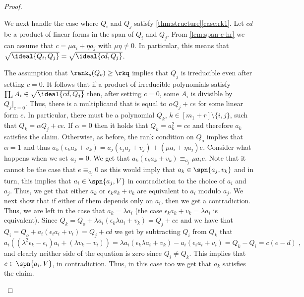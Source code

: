 \begin{proof}
\begin{enumerate}[label=(\roman*)]
	We next handle the case where $Q_i$ and $Q_j$ satisfy \autoref{thm:structure}\ref{case:rk1}. Let $cd$ be a product of linear forms in the span of $Q_i$ and $Q_j$. From \autoref{lem:span-c-hr} we can assume that $c=\mu a_i+\eta a_j$ with $\mu\eta\neq 0$. In particular, this means that $\sqrt{\ideal{Q_i,Q_j}} = \sqrt{\ideal{cd,Q_j}}$. 
	
	The assumption that $\rank_s(Q_o)\geq \rkq$ implies that $Q_j$ is irreducible even after setting $c=0$. It follows that if a product of irreducible polynomials satisfy $\prod_i A_i \in  \sqrt{\ideal{cd,Q_j}}$ then, after setting $c=0$, some $A_i$ is divisible by ${Q_j}|_{c=0}$. Thus, there is a multiplicand that is equal to $ \alpha Q_j + ce$ for some linear form $e$. In particular, there must be a polynomial $Q_k$, $k\in[m_1+r]\setminus \{i,j\}$, such that  $Q_k = \alpha Q_j + ce$.
	If $\alpha = 0$ then it holds that $Q_k = a_k^2 = ce$ and therefore $a_k$ satisfies the claim. Otherwise, as before, the rank condition on $Q_o$ implies that $\alpha = 1$ and thus $ a_k(\epsilon_k a_k +v_k) =  a_j(\epsilon_j a_j + v_j) + (\mu a_i + \eta a_j)e$. 
	Consider what happens when we set $a_j=0$. We get that $a_k(\epsilon_k a_k +v_k) \equiv_{a_j} \mu a_i e$.  Note that it cannot be the case that $e\equiv_{a_j}0$ as this would imply that $a_k\in\spn{a_j,v_k}$ and in turn, this implies that $a_i \in \spn{a_j,V}$ in contradiction to the choice of $a_i$ and $a_j$. Thus, we get that either $a_k$ or $\epsilon_k a_k +v_k$ are equivalent to $a_i$ modulo $a_j$. We next show that if either of them depends only on $a_i$, then we get a contradiction. Thus, we are left in the case that $a_k = \lambda a_i$ (the case $\epsilon_k a_k + v_k = \lambda a_i$ is equivalent).  Since $Q_k = Q_o+  \lambda a_i\left(\epsilon_k  \lambda a_i + v_k\right) = Q_j + ce$ and we have that $Q_i = Q_o + a_i(\epsilon_i a_i + v_i) = Q_j + cd$ we get by subtracting $Q_i$ from $Q_k$ that 
	\[a_i\left((\lambda^2\epsilon_k - \epsilon_i)a_i + (\lambda v_k -v_i)\right) =\lambda a_i(\epsilon_k  \lambda a_i + v_k) - a_i(\epsilon_i   a_i + v_i) = Q_k-Q_i=c(e-d) \;,\]
	and clearly neither side of the equation is zero since $Q_i\neq Q_k$. 
	This implies that $c \in \spn{a_i,V}$, in contradiction. Thus, in this case too we get that $a_k$ satisfies the claim.
	

\end{enumerate}
\end{proof}
